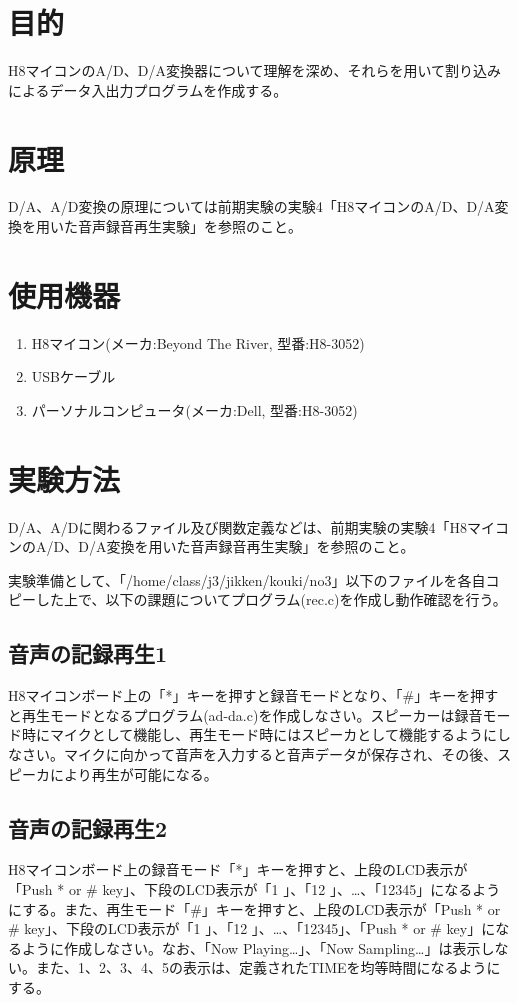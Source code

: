 \documentclass{jarticle}
\begin{document}
\section{目的}
H8マイコンのA/D、D/A変換器について理解を深め、それらを用いて割り込みによるデータ入出力プログラムを作成する。

\section{原理}
D/A、A/D変換の原理については前期実験の実験4「H8マイコンのA/D、D/A変換を用いた音声録音再生実験」を参照のこと。

\section{使用機器}
\begin{enumerate}
	\item H8マイコン(メーカ:Beyond The River, 型番:H8-3052)
	\item USBケーブル
	\item パーソナルコンピュータ(メーカ:Dell, 型番:H8-3052)
\end{enumerate}

\section{実験方法}
D/A、A/Dに関わるファイル及び関数定義などは、前期実験の実験4「H8マイコンのA/D、D/A変換を用いた音声録音再生実験」を参照のこと。

実験準備として、「/home/class/j3/jikken/kouki/no3」以下のファイルを各自コピーした上で、以下の課題についてプログラム(rec.c)を作成し動作確認を行う。

\subsection{音声の記録再生1}
H8マイコンボード上の「*」キーを押すと録音モードとなり、「\#」キーを押すと再生モードとなるプログラム(ad-da.c)を作成しなさい。スピーカーは録音モード時にマイクとして機能し、再生モード時にはスピーカとして機能するようにしなさい。マイクに向かって音声を入力すると音声データが保存され、その後、スピーカにより再生が可能になる。

\subsection{音声の記録再生2}
H8マイコンボード上の録音モード「*」キーを押すと、上段のLCD表示が「Push * or \# key」、下段のLCD表示が「1    」、「12  」、…、「12345」になるようにする。また、再生モード「\#」キーを押すと、上段のLCD表示が「Push * or \# key」、下段のLCD表示が「1    」、「12  」、…、「12345」、「Push * or \# key」になるように作成しなさい。なお、「Now Playing…」、「Now Sampling…」は表示しない。また、1、2、3、4、5の表示は、定義されたTIMEを均等時間になるようにする。
\end{document}
